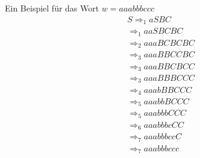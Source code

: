\documentclass{article}
\begin{document}
Ein Beispiel für das Wort $w=aaabbbccc$
\begin{equation}
\begin{split}
&S \Rightarrow_1 aSBC \\\ 
&\Rightarrow_1 aaSBCBC \\\ 
&\Rightarrow_2 aaaBCBCBC \\\ 
&\Rightarrow_3 aaaBBCCBC \\\ 
&\Rightarrow_3 aaaBBCBCC \\\ 
&\Rightarrow_3 aaaBBBCCC \\\ 
&\Rightarrow_4 aaabBBCCC \\\ 
&\Rightarrow_5 aaabbBCCC \\\
&\Rightarrow_5 aaabbbCCC \\\ 
&\Rightarrow_6 aaabbbcCC \\\ 
&\Rightarrow_7 aaabbbccC \\\ 
&\Rightarrow_7 aaabbbccc \\\ 
\end{split}
\end{equation}
\end{document}

